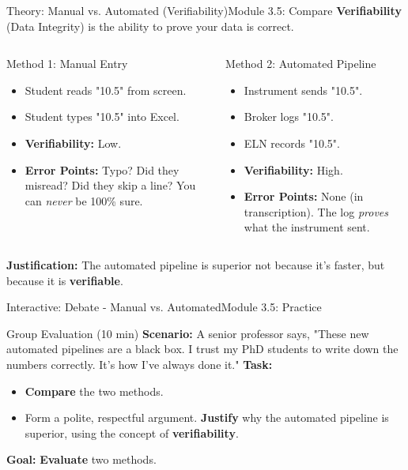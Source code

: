 \begin{frame}{Theory: Manual vs. Automated (Verifiability)}{Module 3.5: Compare}
    \textbf{Verifiability} (Data Integrity) is the ability to prove your data is correct.
    
    \begin{columns}
        \begin{block}{Method 1: Manual Entry}
            \begin{itemize}
                \item Student reads "10.5" from screen.
                \item Student types "10.5" into Excel.
                \item \textbf{Verifiability:} Low.
                \item \textbf{Error Points:} Typo? Did they misread? Did they skip a line? You can \emph{never} be 100\% sure.
            \end{itemize}
        \end{block}
        
        \begin{block}{Method 2: Automated Pipeline}
            \begin{itemize}
                \item Instrument sends "10.5".
                \item Broker logs "10.5".
                \item ELN records "10.5".
                \item \textbf{Verifiability:} High.
                \item \textbf{Error Points:} None (in transcription). The log \emph{proves} what the instrument sent.
            \end{itemize}
        \end{block}
    \end{columns}
    \pause
    \textbf{Justification:} The automated pipeline is superior not because it's faster, but because it is \textbf{verifiable}.
\end{frame}

\begin{frame}{Interactive: Debate - Manual vs. Automated}{Module 3.5: Practice}
    \begin{block}{Group Evaluation (10 min)}
        \textbf{Scenario:} A senior professor says, "These new automated pipelines are a black box. I trust my PhD students to write down the numbers correctly. It's how I've always done it."
        \pause
        \textbf{Task:}
        \begin{itemize}
            \item \textbf{Compare} the two methods.
            \item Form a polite, respectful argument. \textbf{Justify} why the automated pipeline is superior, using the concept of \textbf{verifiability}.
        \end{itemize}
        \pause
        \textbf{Goal:} \textbf{Evaluate} two methods.
    \end{block}
\end{frame}

